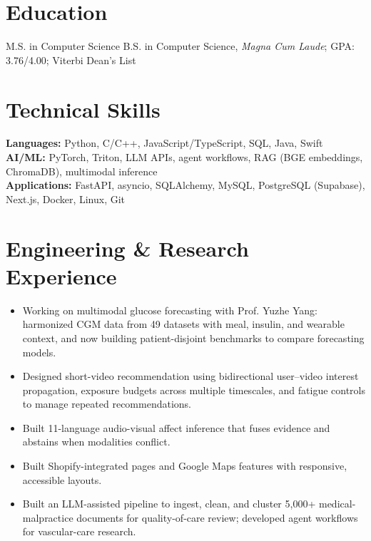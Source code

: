 \documentclass[10pt]{article}
\begin{document}
\englishheader

\section{Education}
M.S. in Computer Science
B.S. in Computer Science, \textit{Magna Cum Laude}; GPA: 3.76/4.00; Viterbi Dean's List

\section{Technical Skills}
\textbf{Languages:} Python, C/C++, JavaScript/TypeScript, SQL, Java, Swift\\
\textbf{AI/ML:} PyTorch, Triton, LLM APIs, agent workflows, RAG (BGE embeddings, ChromaDB), multimodal inference\\
\textbf{Applications:} FastAPI, asyncio, SQLAlchemy, MySQL, PostgreSQL (Supabase), Next.js, Docker, Linux, Git

\section{Engineering \& Research Experience}
\begin{itemize}
\item Working on multimodal glucose forecasting with Prof. Yuzhe Yang: harmonized CGM data from 49 datasets with meal, insulin, and wearable context, and now building patient-disjoint benchmarks to compare forecasting models.
\end{itemize}
\begin{itemize}
\item Designed short-video recommendation using bidirectional user–video interest propagation, exposure budgets across multiple timescales, and fatigue controls to manage repeated recommendations.
\item Built 11-language audio-visual affect inference that fuses evidence and abstains when modalities conflict.
\end{itemize}
\begin{itemize}
\item Built Shopify-integrated pages and Google Maps features with responsive, accessible layouts.
\end{itemize}
\begin{itemize}
\item Built an LLM-assisted pipeline to ingest, clean, and cluster 5,000+ medical-malpractice documents for quality-of-care review; developed agent workflows for vascular-care research.
\end{itemize}
\end{document}

